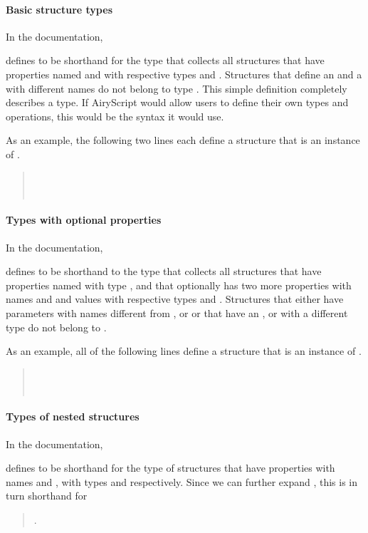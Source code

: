 \paragraph{Basic structure types}
In the documentation,
\begin{quote}
\end{quote}
defines  to be shorthand for the type that collects all structures that
have properties named  and  with respective types  and
. Structures that define an  and a  with
different names do not belong to type . This simple definition completely
describes a type. If AiryScript would allow users to define their own types and
operations, this would be the syntax it would use.

As an example, the following two lines each define a structure that is an
instance of .
\begin{quote}
  \\
  \\
\end{quote}


\paragraph{Types with optional properties}
In the documentation,
\begin{quote}
\end{quote}
defines  to be shorthand to the type that collects all structures that
have properties named  with type , and that optionally has two
more properties with names  and  and values with respective types
 and . Structures that either have parameters
with names different from ,  or  or that have an ,
 or  with a different type do not belong to .

As an example, all of the following lines define a structure that is an
instance of .
\begin{quote}
  \\
  \\
\end{quote}

\paragraph{Types of nested structures}
In the documentation,
\begin{quote}
\end{quote}
defines  to be shorthand for the type of structures that have properties
with names  and , with types  and 
respectively. Since we can further expand , this is in turn shorthand for
\begin{quote}
  . 
\end{quote}

